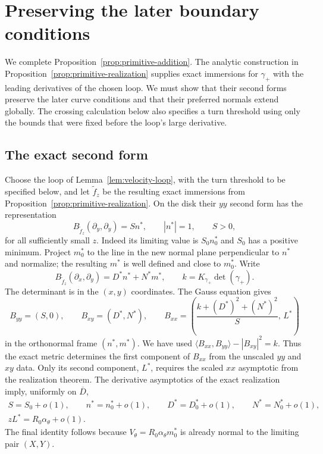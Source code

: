 \section{Preserving the later boundary conditions}
\label{sec:geometry-preservation}

We complete Proposition~\ref{prop:primitive-addition}.  The analytic
construction in Proposition~\ref{prop:primitive-realization} supplies
exact immersions for $\gamma_+$ with the leading derivatives of the
chosen loop.  We must show that their second forms preserve the later
curve conditions and that their preferred normals extend globally.
The crossing calculation below also specifies a turn threshold using
only the bounds that were fixed before the loop's large derivative.

\subsection{The exact second form}

Choose the loop of Lemma~\ref{lem:velocity-loop}, with the turn threshold
to be specified below, and let $\widetilde f_z$ be the resulting exact
immersions from Proposition~\ref{prop:primitive-realization}.  On the
disk their $yy$ second form has the representation
\[
 B_{\widetilde f_z}(\partial_y,\partial_y)=S n^*,\qquad
 |n^*|=1,\qquad S>0,
\]
for all sufficiently small $z$.  Indeed its limiting value is
$S_0n_0^*$ and $S_0$ has a positive minimum.  Project $m_0^*$ to the line
in the new normal plane perpendicular to $n^*$ and normalize; the
resulting $m^*$ is well defined and close to $m_0^*$.
Write
\[
 B_{\widetilde f_z}(\partial_x,\partial_y)=D^* n^*+N^* m^*,\qquad
 k=K_{\gamma_+}\det(\gamma_+).
\]
The determinant is in the $(x,y)$ coordinates.  The Gauss equation gives
\begin{equation}
 B_{yy}=(S,0),\qquad B_{xy}=(D^*,N^*),\qquad
 B_{xx}=\left(\frac{k+(D^*)^2+(N^*)^2}{S},\,L^*\right)
 \label{eq:exact-second-form}
\end{equation}
in the orthonormal frame $(n^*,m^*)$.  We have used
$\langle B_{xx},B_{yy}\rangle-|B_{xy}|^2=k$.
Thus the exact metric determines the first component of $B_{xx}$ from
the unscaled $yy$ and $xy$ data.  Only its second component, $L^*$,
requires the scaled $xx$ asymptotic from the realization theorem.
The derivative asymptotics of the exact realization imply, uniformly
on $\overline D$,
\begin{equation}
 \begin{gathered}
 S=S_0+o(1),\qquad n^*=n_0^*+o(1),\qquad
 D^*=D_0^*+o(1),\qquad N^*=N_0^*+o(1),\\
 zL^*=R_0\alpha_\theta+o(1).
 \end{gathered}
 \label{eq:second-form-limits}
\end{equation}
The final identity follows because
$V_\theta=R_0\alpha_\theta m_0^*$ is already normal to the limiting
pair $(X,Y)$.

